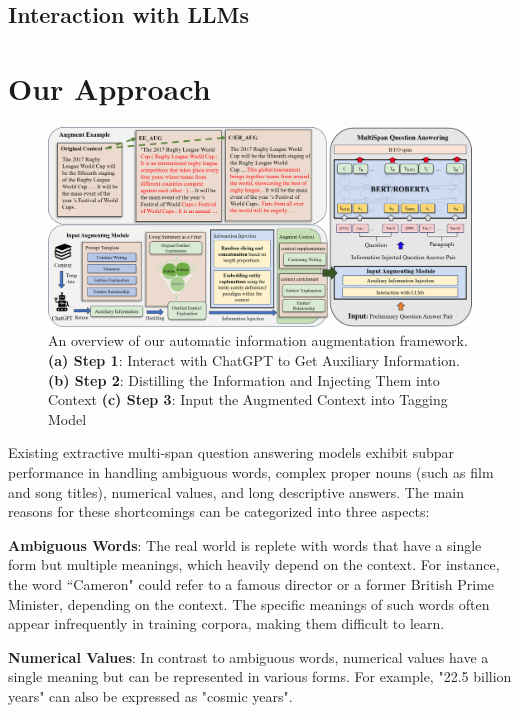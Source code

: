 \documentclass[a4paper,fleqn,twocolumn]{cas-dc}
\newcommand{\1}[1]{\mathds{1}\left[#1\right]}
\begin{document}
\subsection{Interaction with LLMs}



\section{Our Approach}

	\begin{figure}[h]
	\centering
	\includegraphics[width=18cm]{overview.png}
	\caption{An overview of our automatic information augmentation framework. \textbf{(a) Step 1}: Interact with ChatGPT to Get Auxiliary Information. \textbf{(b) Step 2}: Distilling the Information and Injecting Them into Context \textbf{(c) Step 3}: Input the Augmented Context into Tagging Model}
	\label{fig:overview}
	\end{figure}   


	Existing extractive multi-span question answering models exhibit subpar performance in handling ambiguous words, complex proper nouns (such as film and song titles), numerical values, and long descriptive answers. The main reasons for these shortcomings can be categorized into three aspects:
	
	\textbf{Ambiguous Words}: The real world is replete with words that have a single form but multiple meanings, which heavily depend on the context. For instance, the word ``Cameron" could refer to a famous director or a former British Prime Minister, depending on the context. The specific meanings of such words often appear infrequently in training corpora, making them difficult to learn.
	
	\textbf{Numerical Values}: In contrast to ambiguous words, numerical values have a single meaning but can be represented in various forms. For example, "22.5 billion years" can also be expressed as "cosmic years".
	
\end{document}
